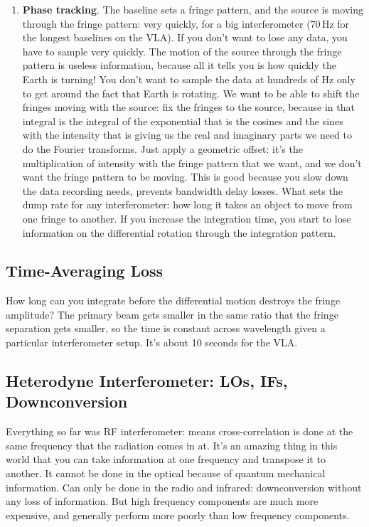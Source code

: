 \documentclass[a4paper]{article}
\begin{document}
\begin{enumerate}
\item \textbf{Phase tracking}. The baseline sets a fringe pattern, and the source is moving through the fringe pattern: very quickly, for a big interferometer (70\,Hz for the longest baselines on the VLA). If you don't want to lose any data, you have to sample very quickly. The motion of the source through the fringe pattern is useless information, because all it tells you is how quickly the Earth is turning! You don't want to sample the data at hundreds of Hz only to get around the fact that Earth is rotating. We want to be able to shift the fringes moving with the source: fix the fringes to the source, because in that integral is the integral of the exponential that is the cosines and the sines with the intensity that is giving us the real and imaginary parts we need to do the Fourier transforms. Just apply a geometric offset: it's the multiplication of intensity with the fringe pattern that we want, and we don't want the fringe pattern to be moving. This is good because you slow down the data recording needs, prevents bandwidth delay losses. What sets the dump rate for any interferometer: how long it takes an object to move from one fringe to another. If you increase the integration time, you start to lose information on the differential rotation through the integration pattern. 

\end{enumerate}

\subsection{Time-Averaging Loss}

How long can you integrate before the differential motion destroys the fringe amplitude? The primary beam gets smaller in the same ratio that the fringe separation gets smaller, so the time is constant across wavelength given a particular interferometer setup. It's about 10 seconds for the VLA. 

\subsection{Heterodyne Interferometer: LOs, IFs, Downconversion}

Everything so far was RF interferometer: means cross-correlation is done at the same frequency that the radiation comes in at. It's an amazing thing in this world that you can take information at one frequency and transpose it to another. It cannot be done in the optical because of quantum mechanical information. Can only be done in the radio and infrared: downconversion without any loss of information.
But high frequency components are much more expensive, and generally perform more poorly than low frequency components.
\end{document}
